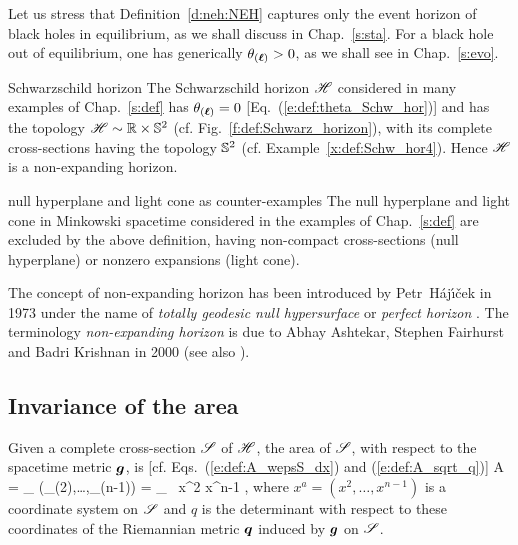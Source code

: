 Let us stress that Definition~\ref{d:neh:NEH} captures only
the event horizon of black holes in equilibrium,
as we shall discuss in Chap.~\ref{s:sta}.
For a black hole out of equilibrium, one has generically $\theta_{(\bm{\ell})} > 0$,
as we shall see in Chap.~\ref{s:evo}.

\begin{texample}{Schwarzschild horizon}{}
The Schwarzschild horizon $\mathscr{H}$ considered in many examples of Chap.~\ref{s:def}
has $\theta_{(\bm{\ell})} = 0$ [Eq.~(\ref{e:def:theta_Schw_hor})]
and has the topology $\mathscr{H} \sim \mathbb{R}\times \mathbb{S}^2$ (cf. Fig.~\ref{f:def:Schwarz_horizon}),
with its complete cross-sections having the topology $\mathbb{S}^2$ (cf. Example~\ref{x:def:Schw_hor4}).
Hence $\mathscr{H}$ is a non-expanding horizon.
\end{texample}

\begin{texample}{null hyperplane and light cone as counter-examples}{}
The null hyperplane and light cone in Minkowski spacetime considered
in the examples of Chap.~\ref{s:def} are excluded by the above definition,
having non-compact cross-sections (null hyperplane) or nonzero expansions
(light cone).
\end{texample}

\begin{hist}\label{h:neh:NEH}
The concept of non-expanding horizon has been introduced by
Petr~H\'aj\'{\i}\v{c}ek
in 1973 under the name of \emph{totally geodesic null hypersurface} \cite{Hajic73a}
or \emph{perfect horizon} \cite{Hajic73b,Hajic74}.
The terminology \emph{non-expanding horizon} is due to
Abhay Ashtekar, Stephen Fairhurst
and Badri Krishnan in 2000 \cite{AshteFK00} (see also \cite{AshteBL02}).
\end{hist}

\subsection{Invariance of the area} \label{s:neh:invar_area}

Given a complete cross-section $\mathscr{S}$ of $\mathscr{H}$, the area of $\mathscr{S}$, with respect to the spacetime metric $\bm{g}$, is [cf. Eqs.~(\ref{e:def:A_wepsS_dx}) and (\ref{e:def:A_sqrt_q})]
\be \label{e:neh:total_area}
    A = \int_{\Sp} \wepsS(\D{}_{(2)},\ldots,\D{}_{(n-1)})
        = \int_{\Sp}  \, \D x^2 \cdots \D x^{n-1} ,
\ee
where $x^a = (x^2, \ldots, x^{n-1})$ is a coordinate system on $\mathscr{S}$ and $q$ is
the determinant with respect to these coordinates of the Riemannian metric $\bm{q}$
induced by $\bm{g}$ on $\mathscr{S}$.

